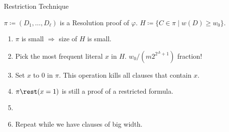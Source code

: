 \begin{frame}{Restriction Technique}
    
    $\pi \coloneqq (D_1, \dots, D_{\ell})$ is a Resolution proof of $\varphi$. $H \coloneqq \{C \in \pi
    \mid w(D) \ge w_0 \}$.

    \begin{enumerate}
        \item $\pi$ is small $\Rightarrow$ size of $H$ is small.
        \pause
        \item Pick the most frequent literal $x$ in $H$. \alert{$w_0 / (m 2^{2^{\Delta} + 1})$ fraction!}
        \pause
        \item Set $x$ to $0$ in $\pi$. This operation kills all clauses that contain $x$.
        \pause
        \item $\pi \rest (x = 1)$ is still a proof of a restricted formula.
            \pause
        \item {}
        \pause
        \pause    
        \item Repeat while we have clauses of big width.
    \end{enumerate}


\end{frame}
